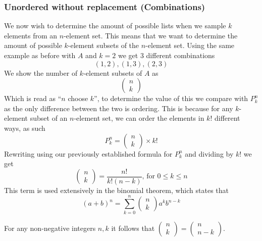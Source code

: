 \subsubsection{Unordered without replacement (Combinations)}
We now wish to determine the amount of possible lists when we sample $k$ elements from an $n$-element set. This means that we want to determine the amount of possible $k$-element subsets of the $n$-element set. Using the same example as before with $A$ and $k=2$ we get 3 different combinations
\[
    (1,2),(1,3),(2,3)
\]
We show the number of $k$-element subsets of $A$ as
\[\begin{pmatrix}
  n \\
  k
 \end{pmatrix}\]
Which is read as ``$n$ choose $k$'', to determine the value of this we compare with $P_{k}^{n}$ as the only difference between the two is ordering. This is because for any $k$-element subset of an $n$-element set, we can order the elements in $k!$ different ways, as such
\[
    P_{k}^{n}=\begin{pmatrix}n\\k\end{pmatrix}\times k!
\]
Rewriting using our previously established formula for $P_{k}^{n}$ and dividing by $k!$ we get
\[
    \begin{pmatrix}n\\k\end{pmatrix}=\frac{n!}{k!(n-k)}\text{, for }0\leq k\leq n
\]
This term is used extensively in the binomial theorem, which states that
\[
    (a+b)^{n}=\sum_{k=0}^{n}\begin{pmatrix}n\\k\end{pmatrix}a^{k}b^{n-k}
\]
\begin{theorem}
    For any non-negative integers $n,k$ it follows that $\begin{pmatrix}n\\k\end{pmatrix}=\begin{pmatrix}n\\n-k\end{pmatrix}$.
\end{theorem}
